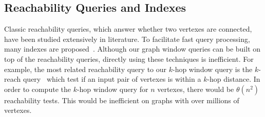 %
%

\subsection{Reachability Queries and Indexes}
Classic reachability queries, which
answer whether two vertexes are connected, have 
been studied extensively in literature. 
To facilitate fast query processing, many indexes are
proposed~\cite{cheng2013tf,cheng2012k,wei2014reachability,yu2010graph}. 
Although our graph window queries
can be built on top of the reachability queries, directly
using these techniques is inefficient. For example, the
most related reachability
query to our $k$-hop window query is the $k$-reach query~\cite{cheng2012k} which
test if an input pair of vertexes is within a $k$-hop distance. In order
to compute the $k$-hop window query for $n$ vertexes, there would be $\theta(n^2)$
reachability tests. This would be inefficient on graphs
with over millions of vertexes.

%

